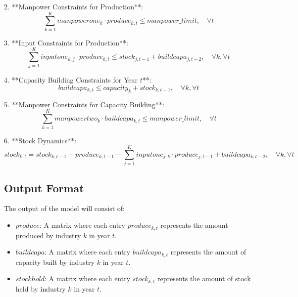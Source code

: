 \documentclass{article}
\begin{document}
2. **Manpower Constraints for Production**:
\[
\sum_{k=1}^{K} manpowerone_{k} \cdot produce_{k, t} \leq manpower\_limit, \quad \forall t
\]

3. **Input Constraints for Production**:
\[
\sum_{j=1}^{K} inputone_{k, j} \cdot produce_{k, t} \leq stock_{j, t-1} + buildcapa_{j, t-2}, \quad \forall k, \forall t
\]

4. **Capacity Building Constraints for Year $t$**:
\[
buildcapa_{k, t} \leq capacity_{k} + stock_{k, t-1}, \quad \forall k, \forall t
\]

5. **Manpower Constraints for Capacity Building**:
\[
\sum_{k=1}^{K} manpowertwo_{k} \cdot buildcapa_{k, t} \leq manpower\_limit, \quad \forall t
\]

6. **Stock Dynamics**:
\[
stock_{k, t} = stock_{k, t-1} + produce_{k, t-1} - \sum_{j=1}^{K} inputone_{j, k} \cdot produce_{j, t-1} + buildcapa_{k, t-2}, \quad \forall k, \forall t
\]

\subsection*{Output Format}
The output of the model will consist of:
\begin{itemize}
    \item $produce$: A matrix where each entry $produce_{k, t}$ represents the amount produced by industry $k$ in year $t$.
    \item $buildcapa$: A matrix where each entry $buildcapa_{k, t}$ represents the amount of capacity built by industry $k$ in year $t$.
    \item $stockhold$: A matrix where each entry $stock_{k, t}$ represents the amount of stock held by industry $k$ in year $t$.
\end{itemize}
\end{document}
